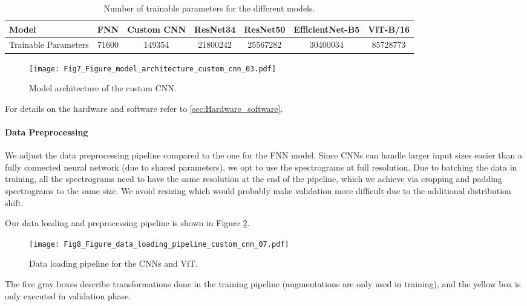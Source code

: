 \documentclass[preprint,NumberedRefs]{JASA}
\begin{document}
\begin{table}[tb]
    \caption{\label{tab:model_params} Number of trainable parameters for the different models.}
    \begin{ruledtabular}
    \begin{tabular}{l|cccccc}
    Model & FNN & Custom CNN & ResNet34 & ResNet50 & EfficientNet-B5 & ViT-B/16 \\
    \hline
    Trainable Parameters & \num{71600} & \num{149354} & \num{21800242} & \num{25567282} & \num{30400034} & \num{85728773} \\
    \end{tabular}
    \end{ruledtabular}
\end{table}

\begin{figure}[tb]
    \texttt{[image: Fig7\_Figure\_model\_architecture\_custom\_cnn\_03.pdf]}
    \caption{\label{fig:model_architecture_custom_cnn}{Model architecture of the custom CNN.}}
\end{figure}

For details on the hardware and software refer to \autoref{sec:Hardware_software}.

\paragraph{Data Preprocessing}
\label{sec:Data_preprocessing_CNN}

We adjust the data preprocessing pipeline compared to the one for the FNN model.
%
Since CNNs can handle larger input sizes easier than a fully connected neural network (due to shared parameters), we opt to use the spectrograms at full resolution.
%
Due to batching the data in training, all the spectrograms need to have the same resolution at the end of the pipeline, which we achieve via cropping and padding spectrograms to the same size. We avoid resizing which would probably make validation more difficult due to the additional distribution shift.

Our data loading and preprocessing pipeline is shown in Figure \ref{fig:data_loading_custom_cnn}.

\begin{figure}[tb]
    \texttt{[image: Fig8\_Figure\_data\_loading\_pipeline\_custom\_cnn\_07.pdf]}
    \caption{\label{fig:data_loading_custom_cnn}{Data loading pipeline for the CNNs and ViT.}}
\end{figure}
%
The five gray boxes describe transformations done in the training pipeline (augmentations are only used in training), and the yellow box is only executed in validation phase.
\end{document}
